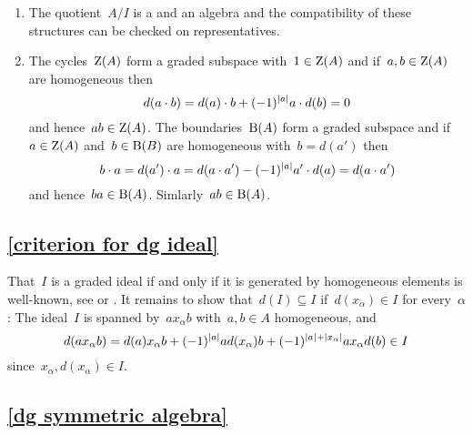 \begin{enumerate}[start=3]
  \item
    The quotient~$A/I$ is a {\dgv} and an algebra and the compatibility of these structures can be checked on representatives.
  \item
    The cycles~$\operatorname{Z}(A)$ form a graded subspace with~$1 \in \operatorname{Z}(A)$ and if~$a, b \in \operatorname{Z}(A)$ are homogeneous then
    \[
      d(a \cdot b)
      =
      d(a) \cdot b
      +
      (-1)^{\lvert a\rvert} a \cdot d(b)
      =
      0
    \]
    and hence~$ab \in \operatorname{Z}(A)$.
    The boundaries~$\operatorname{B}(A)$ form a graded subspace and if~$a \in \operatorname{Z}(A)$ and~$b \in \operatorname{B}(B)$ are homogeneous with~$b = d(a')$ then
    \[
      b \cdot a
      =
      d(a') \cdot a
      =
      d(a \cdot a')
      -
      (-1)^{\lvert a\rvert} a' \cdot d(a)
      =
      d(a \cdot a')
    \]
    and hence~$ba \in \operatorname{B}(A)$.
    Simlarly~$ab \in \operatorname{B}(A)$.
  \leavevmode
\end{enumerate}



\subsection{\cref{criterion for dg ideal}}
\label{criterion for dg ideal proof}

That~$I$ is a graded ideal if and only if it is generated by homogeneous elements is  well-known, see \cite[IX, 2.5]{lang} or \cite[II.{\S}11.3]{bourbaki}.
It remains to show that~$d(I) \subseteq I$ if~$d(x_\alpha) \in I$ for every~$\alpha$:
The ideal~$I$ is spanned by~$a x_\alpha b$ with~$a, b \in A$ homogeneous, and
\[
  d(a x_\alpha b)
  =
    d(a) x_\alpha b
  + (-1)^{\lvert a\rvert} a d(x_\alpha) b
  + (-1)^{\lvert a\rvert + \lvert x_\alpha\rvert} a x_\alpha d(b)
  \in
  I
\]
since~$x_\alpha, d(x_\alpha) \in I$.



\subsection{\cref{dg symmetric algebra}}
\label{dg symmetric algebra proof}

